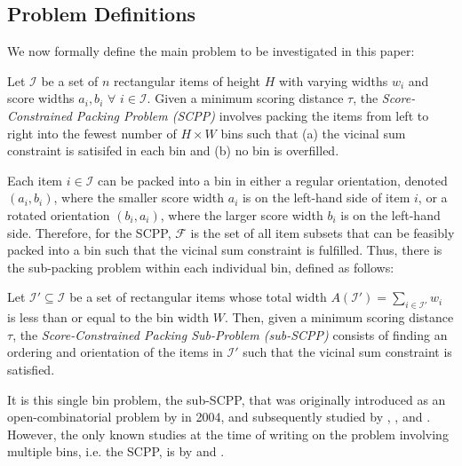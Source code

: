 \documentclass[a4paper,11pt,authoryear]{elsarticle}
\begin{document}
\subsection{Problem Definitions}
\label{sub:intro}
\noindent We now formally define the main problem to be investigated in this paper:

\begin{definition}
	Let $\mathcal{I}$ be a set of $n$ rectangular items of height $H$ with varying widths $w_i$ and score widths $a_i, b_i$ $\forall$ $i \in \mathcal{I}$. Given a minimum scoring distance $\tau$, the \emph{Score-Constrained Packing Problem (SCPP)} involves packing the items from left to right into the fewest number of $H \times W$ bins such that (a) the vicinal sum constraint is satisifed in each bin and (b) no bin is overfilled.
	\label{defn:scpp}
\end{definition}	

\noindent Each item $i \in \mathcal{I}$ can be packed into a bin in either a regular orientation, denoted $(a_i, b_i)$, where the smaller score width $a_i$ is on the left-hand side of item $i$, or a rotated orientation $(b_i, a_i)$, where the larger score width $b_i$ is on the left-hand side. Therefore, for the SCPP, $\mathcal{F}$ is the set of all item subsets that can be feasibly packed into a bin such that the vicinal sum constraint is fulfilled. Thus, there is the  sub-packing problem within each individual bin, defined as follows:

\begin{definition}
	Let $\mathcal{I}' \subseteq \mathcal{I}$ be a set of rectangular items whose total width $A(\mathcal{I}') = \sum_{i \in \mathcal{I}'} w_i$ is less than or equal to the bin width $W$. Then, given a minimum scoring distance $\tau$, the \emph{Score-Constrained Packing Sub-Problem (sub-SCPP)} consists of finding an ordering and orientation of the items in $\mathcal{I}'$ such that the vicinal sum constraint is satisfied.
	\label{defn:subscp}
\end{definition}


\noindent It is this single bin problem, the sub-SCPP, that was originally introduced as an open-combinatorial problem by \citeauthor{goulimis2004} in 2004, and subsequently studied by \cite{becker2010}, \cite{lewis2011}, and \cite{becker2015}. However, the only known studies at the time of writing on the problem involving multiple bins, i.e. the SCPP, is by \citet{lewis2011} and \cite{hawa2018}.

\end{document}
